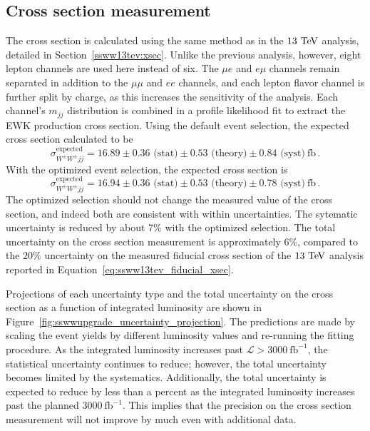 \subsection{Cross section measurement}\label{sswwupgrade:results_xsec}

The cross section is calculated using the same method as in the $13\tev$ analysis, detailed in Section~\ref{ssww13tev:xsec}.
Unlike the previous analysis, however, eight lepton channels are used here instead of six.
The $\mu e$ and $e\mu$ channels remain separated in addition to the $\mu\mu$ and $ee$ channels, and each lepton flavor channel is further split by charge, as this increases the sensitivity of the analysis.
Each channel's $m_{jj}$ distribution is combined in a profile likelihood fit to extract the EWK \ssww production cross section.
Using the default event selection, the expected cross section calculated to be
\begin{equation}
  \sigma_{W^\pm W^\pm jj}^{\textrm{expected}} = 16.89 \pm 0.36 \textrm{\ (stat)} \pm 0.53 \textrm{\ (theory)} \pm 0.84 \textrm{\ (syst)}~\textrm{fb}\,.
  \label{eq:sswwupgrade_xsec_default}
\end{equation}
With the optimized event selection, the expected cross section is
\begin{equation}
    \sigma_{W^\pm W^\pm jj}^{\textrm{expected}} = 16.94 \pm 0.36 \textrm{\ (stat)} \pm 0.53 \textrm{\ (theory)} \pm 0.78 \textrm{\ (syst)}~\textrm{fb}\,.
  \label{eq:sswwupgrade_xsec_optimized}
\end{equation}
The optimized selection should not change the measured value of the cross section, and indeed both are consistent with within uncertainties.
The sytematic uncertainty is reduced by about 7\% with the optimized selection.
The total uncertainty on the cross section measurement is approximately $6\%$, compared to the $20\%$ uncertainty on the measured fiducial cross section of the $13\tev$ analysis reported in Equation~\ref{eq:ssww13tev_fiducial_xsec}.

Projections of each uncertainty type and the total uncertainty on the cross section as a function of integrated luminosity are shown in Figure~\ref{fig:sswwupgrade_uncertainty_projection}.
The predictions are made by scaling the event yields by different luminosity values and re-running the fitting procedure.
As the integrated luminosity increases past $\mathcal{L} > 3000~\textrm{fb}^{-1}$, the statistical uncertainty continues to reduce; however, the total uncertainty becomes limited by the systematics.
Additionally, the total uncertainty is expected to reduce by less than a percent as the integrated luminosity increases past the planned $3000~\textrm{fb}^{-1}$.
This implies that the precision on the cross section measurement will not improve by much even with additional data.

